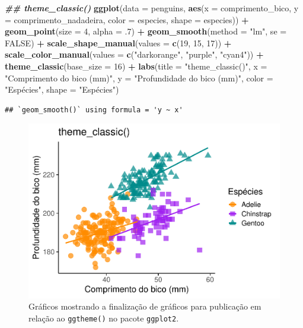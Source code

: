 \documentclass[
]{article}
\newenvironment{Shaded}{\begin{snugshade}}{\end{snugshade}}
\newcommand{\AttributeTok}[1]{\textcolor[rgb]{0.13,0.29,0.53}{#1}}
\newcommand{\ConstantTok}[1]{\textcolor[rgb]{0.56,0.35,0.01}{#1}}
\newcommand{\DecValTok}[1]{\textcolor[rgb]{0.00,0.00,0.81}{#1}}
\newcommand{\DocumentationTok}[1]{\textcolor[rgb]{0.56,0.35,0.01}{\textbf{\textit{#1}}}}
\newcommand{\FunctionTok}[1]{\textcolor[rgb]{0.13,0.29,0.53}{\textbf{#1}}}
\newcommand{\NormalTok}[1]{#1}
\newcommand{\SpecialCharTok}[1]{\textcolor[rgb]{0.81,0.36,0.00}{\textbf{#1}}}
\newcommand{\StringTok}[1]{\textcolor[rgb]{0.31,0.60,0.02}{#1}}
\begin{document}
\begin{Shaded}
\begin{Highlighting}[]
\DocumentationTok{\#\# theme\_classic()}
\FunctionTok{ggplot}\NormalTok{(}\AttributeTok{data =}\NormalTok{ penguins, }
       \FunctionTok{aes}\NormalTok{(}\AttributeTok{x =}\NormalTok{ comprimento\_bico, }\AttributeTok{y =}\NormalTok{ comprimento\_nadadeira,}
           \AttributeTok{color =}\NormalTok{ especies, }\AttributeTok{shape =}\NormalTok{ especies)) }\SpecialCharTok{+}
    \FunctionTok{geom\_point}\NormalTok{(}\AttributeTok{size =} \DecValTok{4}\NormalTok{, }\AttributeTok{alpha =}\NormalTok{ .}\DecValTok{7}\NormalTok{) }\SpecialCharTok{+}
    \FunctionTok{geom\_smooth}\NormalTok{(}\AttributeTok{method =} \StringTok{"lm"}\NormalTok{, }\AttributeTok{se =} \ConstantTok{FALSE}\NormalTok{) }\SpecialCharTok{+}
    \FunctionTok{scale\_shape\_manual}\NormalTok{(}\AttributeTok{values =} \FunctionTok{c}\NormalTok{(}\DecValTok{19}\NormalTok{, }\DecValTok{15}\NormalTok{, }\DecValTok{17}\NormalTok{)) }\SpecialCharTok{+}
    \FunctionTok{scale\_color\_manual}\NormalTok{(}\AttributeTok{values =} \FunctionTok{c}\NormalTok{(}\StringTok{"darkorange"}\NormalTok{, }\StringTok{"purple"}\NormalTok{, }\StringTok{"cyan4"}\NormalTok{)) }\SpecialCharTok{+}
    \FunctionTok{theme\_classic}\NormalTok{(}\AttributeTok{base\_size =} \DecValTok{16}\NormalTok{) }\SpecialCharTok{+}
    \FunctionTok{labs}\NormalTok{(}\AttributeTok{title =} \StringTok{"theme\_classic()"}\NormalTok{, }\AttributeTok{x =} \StringTok{"Comprimento do bico (mm)"}\NormalTok{, }
         \AttributeTok{y =} \StringTok{"Profundidade do bico (mm)"}\NormalTok{, }\AttributeTok{color =} \StringTok{"Espécies"}\NormalTok{, }\AttributeTok{shape =} \StringTok{"Espécies"}\NormalTok{)}
\end{Highlighting}
\end{Shaded}

\begin{verbatim}
## `geom_smooth()` using formula = 'y ~ x'
\end{verbatim}

\begin{figure}
\centering
\includegraphics{epr_files/figure-latex/fig-plot-final-ggtheme-3.pdf}
\caption{\label{fig:fig-plot-final-ggtheme-3}Gráficos mostrando a finalização de gráficos para publicação em relação ao \texttt{ggtheme()} no pacote \texttt{ggplot2}.}
\end{figure}
\end{document}
